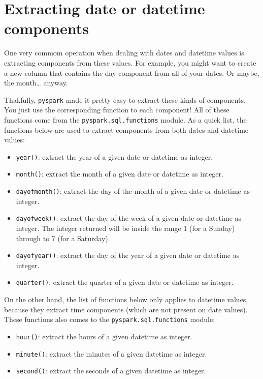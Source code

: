 \documentclass[
  11pt,
  letterpaper,
  DIV=11,
  numbers=noendperiod]{scrreprt}
\providecommand{\tightlist}{%
  \setlength{\itemsep}{0pt}\setlength{\parskip}{0pt}}\usepackage{longtable,booktabs,array}
\begin{document}
\hypertarget{extracting-date-or-datetime-components}{%
\section{Extracting date or datetime
components}\label{extracting-date-or-datetime-components}}

One very commom operation when dealing with dates and datetime values is
extracting components from these values. For example, you might want to
create a new column that contains the day component from all of your
dates. Or maybe, the month\ldots{} anyway.

Thakfully, \texttt{pyspark} made it pretty easy to extract these kinds
of components. You just use the corresponding function to each
component! All of these functions come from the
\texttt{pyspark.sql.functions} module. As a quick list, the functions
below are used to extract components from both dates and datetime
values:

\begin{itemize}
\tightlist
\item
  \texttt{year()}: extract the year of a given date or datetime as
  integer.
\item
  \texttt{month()}: extract the month of a given date or datetime as
  integer.
\item
  \texttt{dayofmonth()}: extract the day of the month of a given date or
  datetime as integer.
\item
  \texttt{dayofweek()}: extract the day of the week of a given date or
  datetime as integer. The integer returned will be inside the range 1
  (for a Sunday) through to 7 (for a Saturday).
\item
  \texttt{dayofyear()}: extract the day of the year of a given date or
  datetime as integer.
\item
  \texttt{quarter()}: extract the quarter of a given date or datetime as
  integer.
\end{itemize}

On the other hand, the list of functions below only applies to datetime
values, because they extract time components (which are not present on
date values). These functions also comes to the
\texttt{pyspark.sql.functions} module:

\begin{itemize}
\tightlist
\item
  \texttt{hour()}: extract the hours of a given datetime as integer.
\item
  \texttt{minute()}: extract the minutes of a given datetime as integer.
\item
  \texttt{second()}: extract the seconds of a given datetime as integer.
\end{itemize}
\end{document}
